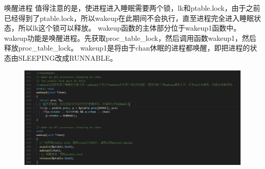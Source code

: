 \documentclass[a4paper,12pt]{report}
\begin{document}
唤醒进程
值得注意的是，使进程进入睡眠需要两个锁，lk和ptable.lock，由于之前已经得到了ptable.lock，所以wakeup在此期间不会执行，直至进程完全进入睡眠状态，所以lk这个锁可以释放。
wakeup函数的主体部分位于wakeup1函数中。
wakeup功能是唤醒进程。先获取proc\_table\_lock，然后调用函数wakeup1，然后释放proc\_table\_lock。
wakeup1是将由于chan休眠的进程都唤醒，即把进程的状态由SLEEPING改成RUNNABLE。
\begin{figure}[H]
	\centering
	\includegraphics [width=1.0\textwidth]{figure//image110.png}
\end{figure}
\end{document}

